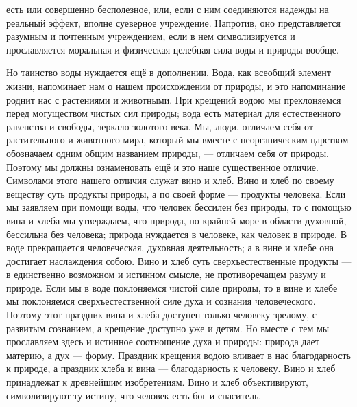 \documentclass[12pt,oneside]{book}
\begin{document}
есть или совершенно бесполезное, или, если с ним соединяются надежды на реальный эффект, вполне суеверное учреждение. Напротив, оно представляется разумным и почтенным учреждением, если в нем символизируется и прославляется моральная и физическая целебная сила воды и природы вообще.



Но таинство воды нуждается ещё в дополнении. Вода, как всеобщий элемент жизни, напоминает нам о нашем происхождении от природы, и это напоминание роднит нас с растениями и животными. При крещений водою мы преклоняемся перед могуществом чистых сил природы; вода есть материал для естественного равенства и свободы, зеркало золотого века. Мы, люди, отличаем себя от растительного и животного мира, который мы вместе с неорганическим царством обозначаем одним общим названием природы, --- отличаем себя от природы. Поэтому мы должны ознаменовать ещё и это наше существенное отличие. Символами этого нашего отличия служат вино и хлеб. Вино и хлеб по своему веществу суть продукты природы, а по своей форме --- продукты человека. Если мы заявляем при помощи воды, что человек бессилен без природы, то с помощью вина и хлеба мы утверждаем, что природа, по крайней море в области духовной, бессильна без человека; природа нуждается в человеке, как человек в природе. В воде прекращается человеческая, духовная деятельность; а в вине и хлебе она достигает наслаждения собою. Вино и хлеб суть сверхъестественные продукты --- в единственно возможном и истинном смысле, не противоречащем разуму и природе. Если мы в воде поклоняемся чистой силе природы, то в вине и хлебе мы поклоняемся сверхъестественной силе духа и сознания человеческого. Поэтому этот праздник вина и хлеба доступен только человеку зрелому, с развитым сознанием, а крещение доступно уже и детям. Но вместе с тем мы прославляем здесь и истинное соотношение духа и природы: природа дает материю, а дух --- форму. Праздник крещения водою вливает в нас благодарность к природе, а праздник хлеба и вина --- благодарность к человеку. Вино и хлеб принадлежат к древнейшим изобретениям. Вино и хлеб объективируют, символизируют ту истину, что человек есть бог и спаситель.
\end{document}
